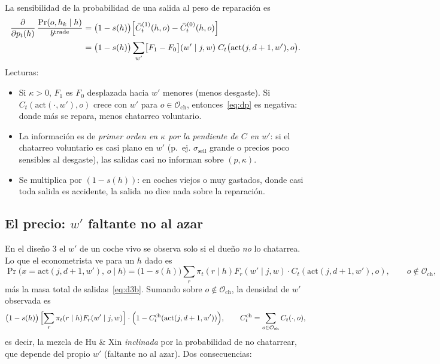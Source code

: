 \documentclass[11pt]{article}
\newcommand{\act}{\mathrm{act}}
\newcommand{\buy}{b}
\newcommand{\1}{\mathbf{1}}
\newcommand{\Osc}{\mathcal{O}_{\mathrm{ch}}}
\begin{document}
La sensibilidad de la probabilidad de una salida al peso de reparación es
\begin{equation}\label{eq:dp}
\begin{aligned}
  \frac{\partial}{\partial p_t(h)}\,\frac{\Pr(o,h_k\mid h)}{\buy^{\text{trade}}}
  &=\bigl(1-s(h)\bigr)\Bigl[\bar C^{(1)}_t(h,o)-\bar C^{(0)}_t(h,o)\Bigr]\\
  &=\bigl(1-s(h)\bigr)\sum_{w'}\bigl[F_1-F_0\bigr](w'\mid j,w)\;C_t\bigl(\act(j,d+1,w'),o\bigr).
\end{aligned}
\end{equation}
Lecturas:
\begin{itemize}
  \item Si $\kappa>0$, $F_1$ es $F_0$ desplazada hacia $w'$ menores (menos desgaste). Si
  $C_t(\act(\cdot,w'),o)$ crece con $w'$ para $o\in\Osc$, entonces~\eqref{eq:dp} es
  negativa: donde más se repara, menos chatarreo voluntario.
  \item La información es de \emph{primer orden en $\kappa$ por la pendiente de $C$ en $w'$}:
  si el chatarreo voluntario es casi plano en $w'$ (p.~ej. $\sigma_{\text{sell}}$ grande o
  precios poco sensibles al desgaste), las salidas casi no informan sobre $(p,\kappa)$.
  \item Se multiplica por $(1-s(h))$: en coches viejos o muy gastados, donde casi toda
  salida es accidente, la salida no dice nada sobre la reparación.
\end{itemize}

\subsection{El precio: $w'$ faltante no al azar}

En el diseño 3 el $w'$ de un coche vivo se observa solo si el dueño \emph{no} lo chatarrea.
Lo que el econometrista ve para un $h$ dado es
\[
  \Pr\bigl(x=\act(j,d+1,w'),\,o\mid h\bigr)=\bigl(1-s(h)\bigr)\sum_r\pi_t(r\mid h)F_r(w'\mid j,w)\cdot C_t(\act(j,d+1,w'),o),
  \qquad o\notin\Osc,
\]
más la masa total de salidas~\eqref{eq:d3b}. Sumando sobre $o\notin\Osc$, la densidad de
$w'$ observada es
\[
  \bigl(1-s(h)\bigr)\,\Bigl[\sum_r\pi_t(r\mid h)F_r(w'\mid j,w)\Bigr]\cdot\Bigl(1-C_t^{\text{ch}}(\act(j,d+1,w'))\Bigr),
  \qquad C^{\text{ch}}_t=\sum_{o\in\Osc}C_t(\cdot,o),
\]
es decir, la mezcla de Hu \& Xin \emph{inclinada} por la probabilidad de no chatarrear, que
depende del propio $w'$ (faltante no al azar). Dos consecuencias:
\end{document}
